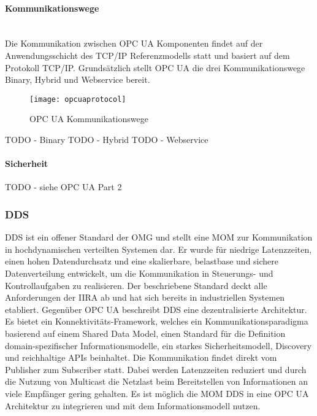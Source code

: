 \paragraph{Kommunikationswege}\mbox{}\\
Die Kommunikation zwischen \ac{OPC UA} Komponenten findet auf der Anwendungsschicht des \ac{TCP}/\ac{IP} Referenzmodells statt und basiert auf dem Protokoll \ac{TCP}/\ac{IP}. Grundsätzlich stellt \ac{OPC UA} die drei Kommunikationswege Binary, Hybrid und Webservice bereit.

\begin{figure}[h]
  \centering
  \texttt{[image: opcuaprotocol]}
  \caption{OPC UA Kommunikationswege} 
  \label{Kap2:OPC UA Kommunikationswege}
\end{figure}

\clearpage

TODO - Binary
TODO - Hybrid
TODO - Webservice

\paragraph{Sicherheit}
TODO - siehe OPC UA Part 2

\subsubsection{\ac{DDS}}
\ac{DDS} ist ein offener Standard der \ac{OMG} und stellt eine \ac{MOM} zur Kommunikation in hochdynamischen verteilten Systemen dar. Er wurde für niedrige Latenzzeiten, einen hohen Datendurchsatz und eine skalierbare, belastbase und sichere Datenverteilung entwickelt, um die Kommunikation in Steuerungs- und Kontrollaufgaben zu realisieren. Der beschriebene Standard deckt alle Anforderungen der \ac{IIRA} ab und hat sich bereits in industriellen Systemen etabliert. Gegenüber \ac{OPC UA} beschreibt \ac{DDS} eine dezentralisierte Architektur. Es bietet ein Konnektivitäts-Framework, welches ein Kommunikationsparadigma basierend auf einem Shared Data Model, einen Standard für die Definition domain-spezifischer Informationsmodelle, ein starkes Sicherheitsmodell, Discovery und reichhal­tige APIs beinhaltet. Die Kommunikation findet direkt vom Publisher zum Subscriber statt. Dabei werden Latenzzeiten reduziert und durch die Nutzung von Multicast die Netzlast beim Bereitstellen von Informationen an viele Empfänger gering gehalten. Es ist möglich die \ac{MOM} \ac{DDS} in eine \ac{OPC UA} Architektur zu integrieren und mit dem Informationsmodell nutzen.

